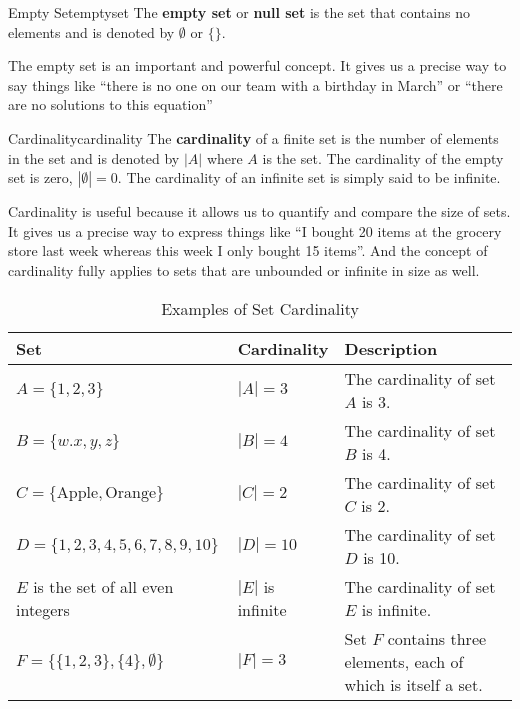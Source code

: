 \begin{definition}{Empty Set}{emptyset}
  The \textbf{empty set} or \textbf{null set} is the set that contains no elements
  and is denoted by \( \emptyset \) or \( \{ \} \).
\end{definition}

The empty set is an important and powerful concept. It gives us a precise way to say
things like ``there is no one on our team with a birthday in March'' or ``there are no
solutions to this equation''

\begin{definition}{Cardinality}{cardinality}
  The \textbf{cardinality} of a finite set is the number of elements in the set and is
  denoted by \( |A| \) where \( A \) is the set. The cardinality of the empty
  set is zero, \( |\emptyset| = 0 \). The cardinality of an infinite set is simply said
  to be infinite.
\end{definition}

Cardinality is useful because it allows us to quantify and compare the size of sets. It
gives us a precise way to express things like ``I bought 20 items at the grocery store
last week whereas this week I only bought 15 items''. And the concept of cardinality
fully applies to sets that are unbounded or infinite in size as well.

\begin{table}[H]
  \centering
  \begin{tabular}{p{2in} p{1in} p{2in}}
    \toprule
    \textbf{Set} & \textbf{Cardinality} & \textbf{Description} \\
    \midrule
    \( A = \{ 1, 2, 3 \} \) & \( |A| = 3 \) & The cardinality of set \(A\) is 3. \\
    \( B = \{ w. x, y, z \} \) & \( |B| = 4 \) & The cardinality of set \(B\) is 4. \\
    \( C = \{ \text{Apple}, \text{Orange} \} \) & \( |C| = 2 \) & The cardinality of set \(C\) is 2. \\
    \( D = \{ 1, 2, 3, 4, 5, 6, 7, 8, 9, 10 \} \) & \( |D| = 10 \) & The cardinality of set \(D\) is 10. \\
    \( E \) is the set of all even integers & \( |E| \) is infinite & The cardinality of set \(E\) is infinite. \\
    \( F = \{ \{1, 2, 3\}, \{4\}, \emptyset \} \) & \( |F| = 3 \) & Set \(F\) contains three elements, each of which is itself a set. \\
    \bottomrule
  \end{tabular}
  \caption{Examples of Set Cardinality}
\end{table}

